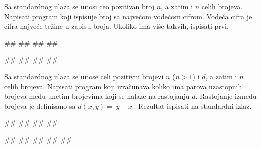 \begin{Exercise}[label=p1.3_18] 
Sa standardnog ulaza se unosi ceo pozitivan broj $n$, a zatim i $n$
celih brojeva. Napisati program koji ispisuje broj sa najvećom vodećom
cifrom. Vodeća cifra je cifra najveće težine u zapisu broja. Ukoliko ima više
takvih, ispisati prvi. 

\begin{miditest}
\begin{upotreba}{1}
#\naslovInt#
##
##
##
\end{upotreba}
\end{miditest}
\begin{miditest}
\begin{upotreba}{1}
#\naslovInt#
##
##
##
\end{upotreba}
\end{miditest}
\end{Exercise}
\begin{Answer}[ref=p1.3_18]
\end{Answer}


\begin{Exercise}[label=p1.3_19] 
Sa standardnog ulaza se unose celi pozitivni brojevi $n$ ($n>1$) i
$d$, a zatim i $n$ celih brojeva. Napisati program koji izračunava
koliko ima parova uzastopnih brojeva među unetim brojevima koji se
nalaze na rastojanju $d$. Rastojanje između brojeva je definisano sa
$d(x,y)=|y-x|$. Rezultat ispisati na standardni izlaz. 

\begin{miditest}
\begin{upotreba}{1}
#\naslovInt#
##
##
##
\end{upotreba}
\end{miditest}
\begin{miditest}
\begin{upotreba}{2}
#\naslovInt#
##
##
##
##
\end{upotreba}
\end{miditest}
\end{Exercise}
\begin{Answer}[ref=p1.3_19]
\end{Answer}


